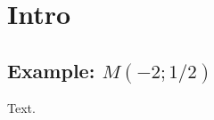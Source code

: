 \documentclass{article}
\begin{document}
\section{Intro}
\subsection[Example: $M(-2;1/2)]{Example: $M(-2;1/2)$}
Text.
\end{document}
